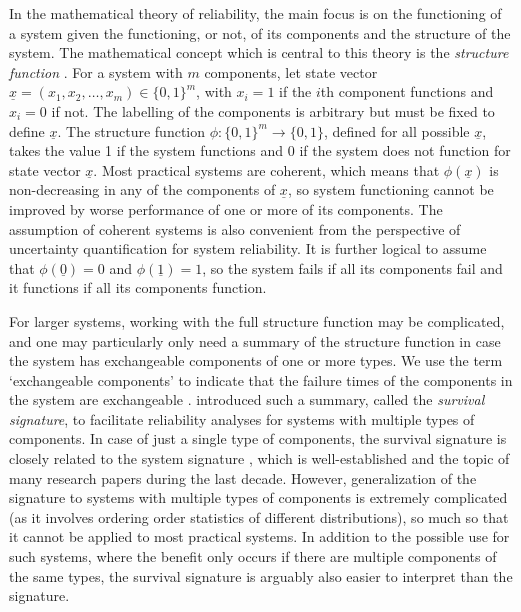 \documentclass[12pt, a4paper]{elsarticle}
\begin{document}
In the mathematical theory of reliability, the main focus is on the functioning of a system given the functioning, or not, 
of its components and the structure of the system. The mathematical concept which is central to this theory is the 
\emph{structure function} \citep{BP75}. For a system with $m$ components, let state vector 
$\underline{x} = (x_1,x_2,\ldots,x_m) \in \{0,1\}^m$, with $x_i=1$ if the $i$th component functions 
and $x_i=0$ if not. The labelling of the components is arbitrary but must be fixed to define $\underline{x}$. 
The structure function $\phi : \{0,1\}^m \rightarrow \{0,1\}$, defined for all possible $\underline{x}$, takes 
the value 1 if the system functions and 0 if the system does not function for state vector $\underline{x}$. 
Most practical systems are coherent, which means that $\phi(\underline{x})$ 
is non-decreasing in any of the components of $\underline{x}$, so system functioning cannot be improved by worse performance 
of one or more of its components. The assumption of coherent systems is also convenient from the perspective of uncertainty
quantification for system reliability. It is further logical to assume that $\phi(\underline{0})=0$ and $\phi(\underline{1})=1$, 
so the system fails if all its components fail and it functions if all its components function. 

For larger systems, working with the full structure function may be complicated, and one may particularly
only need a summary of the structure function in case the system has exchangeable components of one or more
types. We use the term `exchangeable components' to indicate that the failure times of the components in the system
are exchangeable \citep{DF74}. \citet{2012:survsign} introduced such a summary,
called the \emph{survival signature}, 
to facilitate reliability analyses for systems with multiple types of components. In case of just a single type of components, 
the survival signature is closely related to the system signature \citep{Sa07}, which is well-established and the topic of many
research papers during the last decade. However, generalization of the signature to systems with
multiple types of components is extremely complicated (as it involves ordering order statistics of different
distributions), so much so that it cannot be applied to most practical systems. In addition to the 
possible use for such systems, where the benefit only occurs if there are multiple components of the 
same types, the survival signature is arguably also easier to interpret than the signature. 
\end{document}
